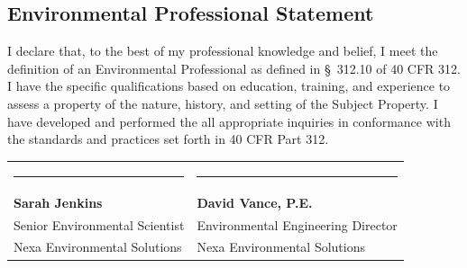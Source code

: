 \subsection{Environmental Professional Statement}
I declare that, to the best of my professional knowledge and belief, I meet the definition of an Environmental Professional as defined in \S~312.10 of 40 CFR 312. I have the specific qualifications based on education, training, and experience to assess a property of the nature, history, and setting of the Subject Property. I have developed and performed the all appropriate inquiries in conformance with the standards and practices set forth in 40 CFR Part 312.

\vspace{1.5cm}

\noindent
\begin{tabularx}{\textwidth}{@{}X X@{}}
  \rule{6.5cm}{0.4pt} & \rule{6.5cm}{0.4pt} \\
  \textbf{Sarah Jenkins} & \textbf{David Vance, P.E.} \\
  Senior Environmental Scientist & Environmental Engineering Director \\
  Nexa Environmental Solutions & Nexa Environmental Solutions
\end{tabularx}

